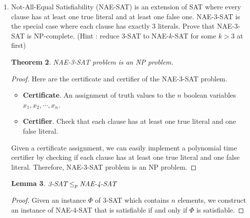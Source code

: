 \documentclass[12pt,a4paper]{article}
\newtheorem{theorem}{Theorem}
\newtheorem{lemma}[theorem]{Lemma}
\theoremstyle{definition}
\begin{document}
\begin{enumerate}
\begin{proof}
\begin{itemize}
    \end{itemize}
    \end{proof}
    \begin{theorem}\label{ELECTION-NPC}
    ELECTION problem is an NP-complete problem.
    \end{theorem}
    \begin{proof}
    According to Theorem \ref{ELECTION-NP}, we know that \emph{ELECTION} problem is an NP problem. Then according to Lemma \ref{3-SAT-REDUCE-ELECTION}, we know that the 3-SAT can be reduced to \emph{ELECTION} problem. Since 3-SAT is an NP-complete problem, \emph{ELECTION} problem should be an NP-complete problem.
    \end{proof}
    \clearpage
    
	\item Not-All-Equal Satisfiability (NAE-SAT) is an extension of SAT where every clause has at least one true literal and at least one false one. NAE-$3$-SAT is the special case where each clause has exactly $3$ literals. Prove that NAE-$3$-SAT is NP-complete. (Hint : reduce $3$-SAT to NAE-$k$-SAT for some $k > 3$ at first)
	\begin{theorem}\label{NAE-3-SAT-NP}
    \emph{NAE-3-SAT} problem is an NP problem.
    \end{theorem}
    \begin{proof}
    Here are the certificate and certifier of the NAE-3-SAT problem.
    \begin{itemize}
    \item \textbf{Certificate}. An assignment of truth values to the $n$ boolean variables $x_1, x_2, \cdots, x_n$.
    \item \textbf{Certifier}. Check that each clause has at least one true literal and one false literal.
    \end{itemize}
    Given a certificate assignment, we can easily implement a polynomial time certifier by checking if each clause has at least one true literal and one false literal. Therefore, NAE-3-SAT problem is an NP problem.
    \end{proof}
    
    \begin{lemma}\label{3-SAT-REDUCE-NAE-4-SAT}
    $\emph{3-SAT} \leq_p \emph{NAE-4-SAT}$
    \end{lemma}
    \begin{proof}
    Given an instance $\Phi$ of 3-SAT which contains $n$ elements, we construct an instance of NAE-4-SAT that is satisfiable if and only if $\Phi$ is satisfiable.
    

\end{proof}
\end{enumerate}
\end{document}
